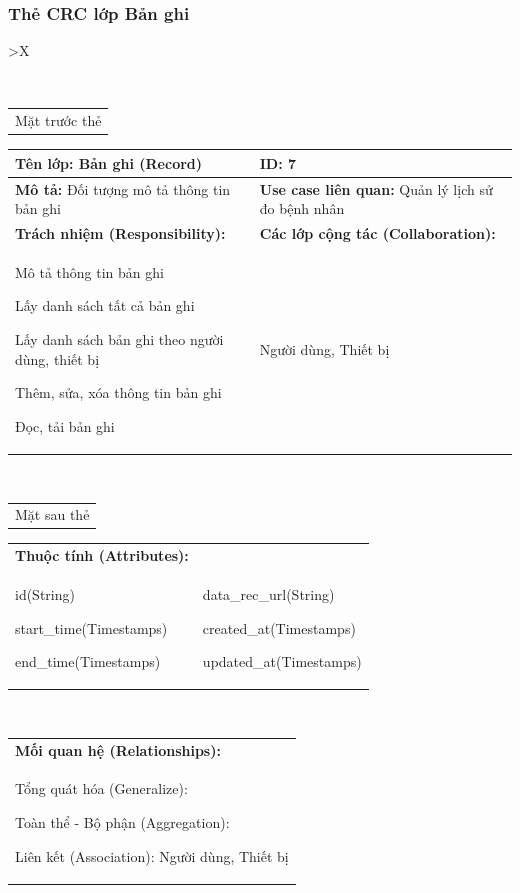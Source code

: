 \subsubsection{Thẻ CRC lớp Bản ghi}
  \begin{xltabular}{\textwidth}{
    >{\centering\arraybackslash}X 
  }
  \caption{\bfseries \fontsize{12pt}{0pt}\selectfont Thẻ CRC lớp Bản ghi}
  \\
  \begin{tabularx}{0.9\textwidth}{X}
    Mặt trước thẻ
  \end{tabularx}
  \begin{tabularx}{0.9\textwidth}{|X|X|}
    \hline
    \textbf{Tên lớp:} Bản ghi (Record) & \textbf{ID:} 7 \\
    \hline
    \textbf{Mô tả:} Đối tượng mô tả thông tin bản ghi & \textbf{Use case liên quan:} Quản lý lịch sử đo bệnh nhân \\
    \hline
    \textbf{Trách nhiệm (Responsibility):} & \textbf{Các lớp cộng tác (Collaboration):} \\
    Mô tả thông tin bản ghi 

    Lấy danh sách tất cả bản ghi

    Lấy danh sách bản ghi theo người dùng, thiết bị

    Thêm, sửa, xóa thông tin bản ghi

    Đọc, tải bản ghi
    & 
    Người dùng, Thiết bị
    \\
    \hline
  \end{tabularx}
  \\ 
  \begin{tabularx}{0.9\textwidth}{X}
    Mặt sau thẻ
  \end{tabularx}
  \begin{tabularx}{0.9\textwidth}{|X|X|}
    \hline
    \textbf{Thuộc tính (Attributes):} & \\
    id(String) 

    start\_time(Timestamps)

    end\_time(Timestamps) 
    & 
    
    data\_rec\_url(String) 
    
    created\_at(Timestamps)

    updated\_at(Timestamps)
    \\
    \hline
  \end{tabularx}
  \\     
  \begin{tabularx}{0.9\textwidth}{|X|}
    \textbf{Mối quan hệ (Relationships):} \\
    Tổng quát hóa (Generalize):  

    Toàn thể - Bộ phận (Aggregation): 
    
    Liên kết (Association):  Người dùng, Thiết bị
    \\
    \hline
  \end{tabularx}
  \end{xltabular}

